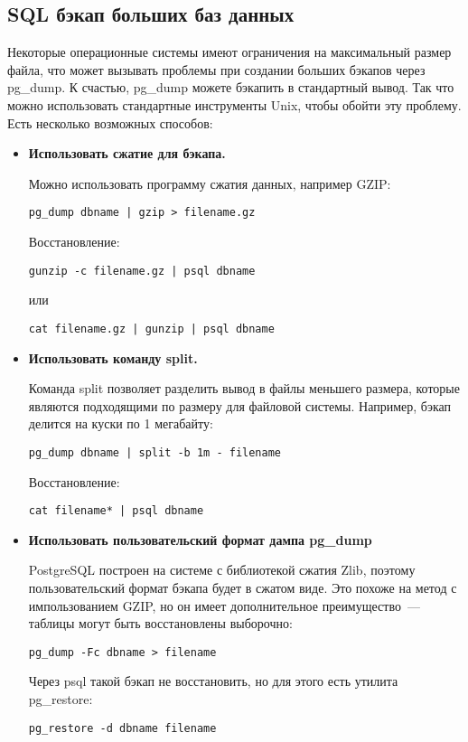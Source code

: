 \subsection{SQL бэкап больших баз данных}
Некоторые операционные системы имеют ограничения на максимальный размер файла, что может вызывать проблемы при создании
больших бэкапов через pg\_dump. К счастью, pg\_dump можете бэкапить в стандартный вывод. Так что можно использовать
стандартные инструменты Unix, чтобы обойти эту проблему. Есть несколько возможных способов:
\begin{itemize}
\item \textbf{Использовать сжатие для бэкапа.}

Можно использовать программу сжатия данных, например GZIP:
\begin{lstlisting}[label=lst:backups7,caption=Сжатие бэкапа PostgreSQL]
pg_dump dbname | gzip > filename.gz
\end{lstlisting}

Восстановление:
\begin{lstlisting}[label=lst:backups8,caption=Восстановление бэкапа PostgreSQL]
gunzip -c filename.gz | psql dbname
\end{lstlisting}
или
\begin{lstlisting}[label=lst:backups9,caption=Восстановление бэкапа PostgreSQL]
cat filename.gz | gunzip | psql dbname
\end{lstlisting}

\item \textbf{Использовать команду split.}

Команда split позволяет разделить вывод в файлы меньшего размера, которые являются подходящими по размеру для файловой системы.
Например, бэкап делится на куски по 1 мегабайту:
\begin{lstlisting}[label=lst:backups10,caption=Создание бэкапа PostgreSQL]
pg_dump dbname | split -b 1m - filename
\end{lstlisting}
Восстановление:
\begin{lstlisting}[label=lst:backups11,caption=Восстановление бэкапа PostgreSQL]
cat filename* | psql dbname
\end{lstlisting}

\item \textbf{Использовать пользовательский формат дампа pg\_dump}

PostgreSQL построен на системе с библиотекой сжатия Zlib, поэтому пользовательский формат бэкапа будет в сжатом виде.
Это похоже на метод с импользованием GZIP, но он имеет дополнительное преимущество~--- таблицы могут быть восстановлены выборочно:
\begin{lstlisting}[label=lst:backups12,caption=Создание бэкапа PostgreSQL]
pg_dump -Fc dbname > filename
\end{lstlisting}
Через psql такой бэкап не восстановить, но для этого есть утилита pg\_restore:
\begin{lstlisting}[label=lst:backups13,caption=Восстановление бэкапа PostgreSQL]
pg_restore -d dbname filename
\end{lstlisting}

\end{itemize}

